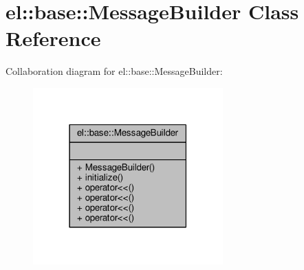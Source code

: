 \hypertarget{classel_1_1base_1_1MessageBuilder}{}\section{el\+:\+:base\+:\+:Message\+Builder Class Reference}
\label{classel_1_1base_1_1MessageBuilder}


Collaboration diagram for el\+:\+:base\+:\+:Message\+Builder\+:
\nopagebreak
\begin{figure}[H]
\begin{center}
\leavevmode
\includegraphics[width=207pt]{d4/db9/classel_1_1base_1_1MessageBuilder__coll__graph}
\end{center}
\end{figure}
